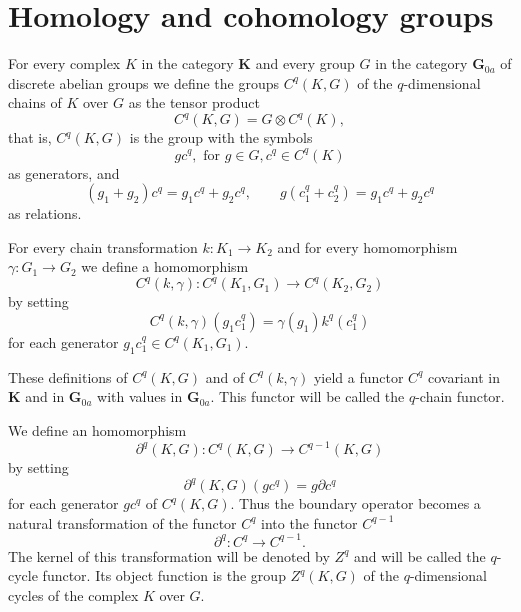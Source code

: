 \documentclass[11pt,a4paper]{report}
\begin{document}
\section{Homology and cohomology groups}\label{sec:hom-grp}
For every complex $K$ in the category $\mathbf{K}$ and every group $G$ in the category $\mathbf{G}_{0a}$ of discrete abelian groups
we define the groups $C^q(K,G)$ of the $q$-dimensional chains of $K$ over $G$ as the tensor product
\begin{equation*}
	C^q(K,G)= G\otimes C^q(K),
\end{equation*}
that is, $C^q(K,G)$ is the group with the symbols
\begin{equation*}
	g c^q,\text{ for } g\in G, c^q\in C^q(K)
\end{equation*}
as generators, and
\begin{equation*}
	(g_1 + g_2)c^q = g_1 c^q + g_2 c^q, \qquad g(c_1^q+c_2^q) = g_1 c^q + g_2 c^q
\end{equation*}
as relations.

For every chain transformation $k:K_1\rightarrow K_2$ and for every homomorphism $\gamma:G_1\rightarrow G_2$ we define a homomorphism
\begin{equation*}
	C^q(k,\gamma):C^q(K_1,G_1)\rightarrow C^q(K_2,G_2)
\end{equation*}
by setting
\begin{equation*}
	C^q(k,\gamma)(g_1 c_1^q)= \gamma(g_1)k^q(c_1^q)
\end{equation*}
for each generator $g_1 c_1^q \in C^q(K_1,G_1)$.

These definitions of $C^q(K,G)$ and of $C^q(k,\gamma)$ yield a functor $C^q$ covariant in $\mathbf{K}$ and in $\mathbf{G}_{0a}$ with
values in $\mathbf{G}_{0a}$. This functor will be called the $q$-chain functor.

We define an homomorphism
\begin{equation*}
	\partial^q(K,G):C^q(K,G)\rightarrow C^{q-1}(K,G)
\end{equation*}
by setting
\begin{equation*}
	\partial^q(K,G)(gc^q)= g\partial c^q
\end{equation*}
for each generator $gc^q$ of $C^q(K,G)$. Thus the boundary operator becomes a natural transformation of the functor $C^q$ into
the functor $C^{q-1}$
\begin{equation*}
	\partial^q:C^q\rightarrow C^{q-1}.
\end{equation*}
The kernel of this transformation will be denoted by $Z^q$ and will be called the $q$-cycle functor. Its object function is
the group $Z^q(K,G)$ of the $q$-dimensional cycles of the complex $K$ over $G$.
\end{document}
